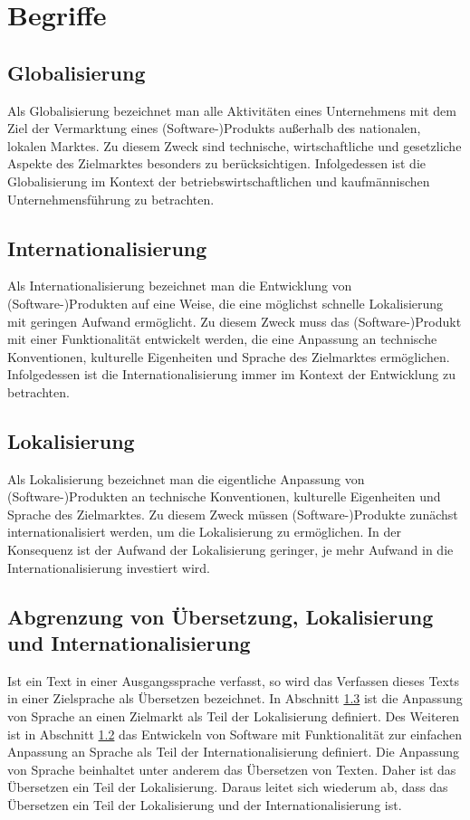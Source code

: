 \chapter{Begriffe}
\section{Globalisierung}
Als Globalisierung bezeichnet man alle Aktivitäten eines Unternehmens mit dem Ziel der Vermarktung eines (Software-)Produkts außerhalb des nationalen, lokalen Marktes. Zu diesem Zweck sind technische, wirtschaftliche und gesetzliche Aspekte des Zielmarktes besonders zu berücksichtigen. Infolgedessen ist die Globalisierung im Kontext der betriebswirtschaftlichen und kaufmännischen Unternehmensführung zu betrachten.
\autocite[Vgl.][S. 1]{Reineke.2005}
\autocite[Vgl.][ S. 2]{Schmitz.2000}
\section{Internationalisierung}
\label{sec:internationalisierung}
Als Internationalisierung bezeichnet man die Entwicklung von (Software-)Produkten auf eine Weise, die eine möglichst schnelle Lokalisierung mit geringen Aufwand ermöglicht. Zu diesem Zweck muss das (Software-)Produkt mit einer Funktionalität entwickelt werden, die eine Anpassung an technische Konventionen, kulturelle Eigenheiten und Sprache des Zielmarktes ermöglichen. Infolgedessen ist die Internationalisierung immer im Kontext der Entwicklung zu betrachten.
\autocite[Vgl.][S. 2]{Reineke.2005}
\autocite[Vgl.][ S. 2]{Schmitz.2000}
\section{Lokalisierung}
\label{sec:lokalisierung}
Als Lokalisierung bezeichnet man die eigentliche Anpassung von (Software-)Produkten an technische Konventionen, kulturelle Eigenheiten und Sprache des Zielmarktes. Zu diesem Zweck müssen (Software-)Produkte zunächst internationalisiert werden, um die Lokalisierung zu ermöglichen.
\autocite[Vgl.][S. 2]{Reineke.2005}
\autocite[Vgl.][ S. 3]{Schmitz.2000}
In der Konsequenz ist der Aufwand der Lokalisierung geringer, je mehr Aufwand in die Internationalisierung investiert wird.
\autocite[Vgl.][S. 2]{Reineke.2005}
\section{Abgrenzung von Übersetzung, Lokalisierung und Internationalisierung}
Ist ein Text in einer Ausgangssprache verfasst, so wird das Verfassen dieses Texts in einer Zielsprache als Übersetzen bezeichnet. In Abschnitt \ref{sec:lokalisierung} ist die Anpassung von Sprache an einen Zielmarkt als Teil der Lokalisierung definiert. Des Weiteren ist in Abschnitt \ref{sec:internationalisierung} das Entwickeln von Software mit Funktionalität zur einfachen Anpassung an Sprache als Teil der Internationalisierung definiert. Die Anpassung von Sprache beinhaltet unter anderem das Übersetzen von Texten. Daher ist das Übersetzen ein Teil der Lokalisierung. Daraus leitet sich wiederum ab, dass das Übersetzen ein Teil der Lokalisierung und der Internationalisierung ist.
